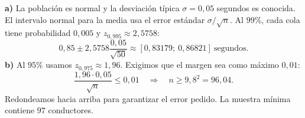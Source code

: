 \textbf{a)} La población es normal y la desviación típica $\sigma=0{,}05$ segundos es conocida. El intervalo normal para la media usa el error estándar $\sigma/\sqrt n$. Al $99\%$, cada cola tiene probabilidad $0{,}005$ y $z_{0{,}995}\approx2{,}5758$:
\[
 0{,}85\pm2{,}5758\frac{0{,}05}{\sqrt{50}}
 \approx\boxed{[0{,}83179;\ 0{,}86821]}\ \text{segundos}.
\]
\textbf{b)} Al $95\%$ usamos $z_{0{,}975}\approx1{,}96$. Exigimos que el margen sea como máximo $0{,}01$:
\[
 \frac{1{,}96\cdot0{,}05}{\sqrt n}\le0{,}01
 \quad\Longrightarrow\quad n\ge9{,}8^2=96{,}04.
\]
Redondeamos hacia arriba para garantizar el error pedido. La muestra mínima contiene $\boxed{97}$ conductores.
